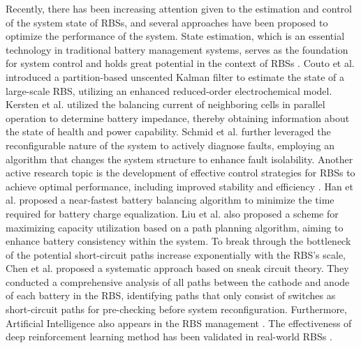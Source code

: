 \documentclass{article}
\begin{document}
Recently, there has been increasing attention given to the estimation and control of the system state of RBSs, and several approaches have been proposed to optimize the performance of the system. 
State estimation, which is an essential technology in traditional battery management systems, serves as the foundation for system control and holds great potential in the context of RBSs \cite{komsiyskaCriticalReviewIntelligent2021}.
Couto et al. \cite{coutoPartitionbasedUnscentedKalman2018a} introduced a partition-based unscented Kalman filter to estimate the state of a large-scale RBS, utilizing an enhanced reduced-order electrochemical model. 
Kersten et al. \cite{kerstenOnlineOnBoardBattery2020a} utilized the balancing current of neighboring cells in parallel operation to determine battery impedance, thereby obtaining information about the state of health and power capability. 
Schmid et al. \cite{schmidActiveModelBasedFault2021a} further leveraged the reconfigurable nature of the system to actively diagnose faults, employing an algorithm that changes the system structure to enhance fault isolability. 
Another active research topic is the development of effective control strategies for RBSs to achieve optimal performance, including improved stability \cite{kacetlDesignAnalysisModular2023b} and efficiency \cite{yangAdaptiveControlFramework2022}.
Han et al. \cite{hanNearFastestBatteryBalancing2019a} proposed a near-fastest battery balancing algorithm to minimize the time required for battery charge equalization.
Liu et al. \cite{liuFlexiblePathPlanningbased2023a} also proposed a scheme for maximizing capacity utilization based on a path planning algorithm, aiming to enhance battery consistency within the system.
To break through the bottleneck of the potential short-circuit paths increase exponentially with the RBS's scale, Chen et al. \cite{chenSneakCircuitTheory2021} proposed a systematic approach based on sneak circuit theory. 
They conducted a comprehensive analysis of all paths between the cathode and anode of each battery in the RBS, identifying paths that only consist of switches as short-circuit paths for pre-checking before system reconfiguration. 
Furthermore, Artificial Intelligence also appears in the RBS management \cite{liuLongLifetimeBattery2022a}.
The effectiveness of deep reinforcement learning method has been validated in real-world RBSs \cite{yangAdaptiveControlFramework2022}.
\end{document}
